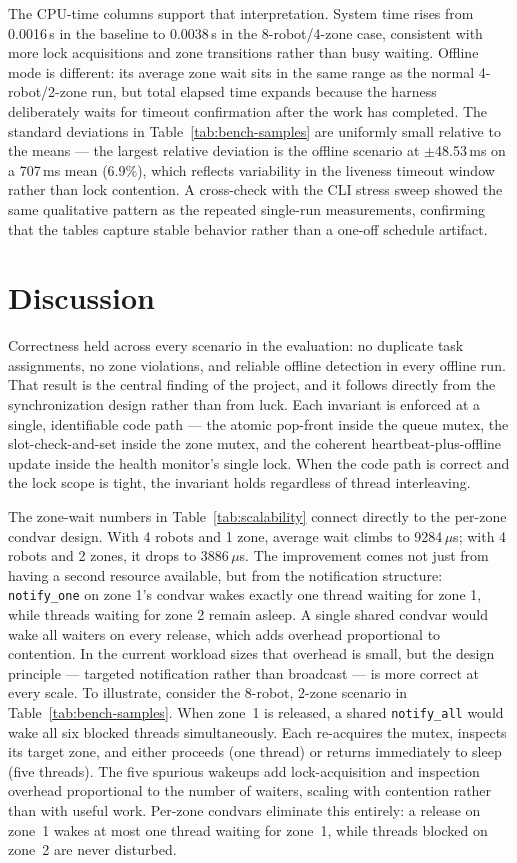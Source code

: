 \documentclass[11pt]{article}
\begin{document}
The CPU-time columns support that interpretation. System time rises from 0.0016\,s in the baseline to 0.0038\,s in the 8-robot/4-zone case, consistent with more lock acquisitions and zone transitions rather than busy waiting. Offline mode is different: its average zone wait sits in the same range as the normal 4-robot/2-zone run, but total elapsed time expands because the harness deliberately waits for timeout confirmation after the work has completed. The standard deviations in Table~\ref{tab:bench-samples} are uniformly small relative to the means --- the largest relative deviation is the offline scenario at \(\pm\)48.53\,ms on a 707\,ms mean (6.9\%), which reflects variability in the liveness timeout window rather than lock contention. A cross-check with the CLI stress sweep showed the same qualitative pattern as the repeated single-run measurements, confirming that the tables capture stable behavior rather than a one-off schedule artifact.

\section{Discussion}
Correctness held across every scenario in the evaluation: no duplicate task assignments, no zone violations, and reliable offline detection in every offline run. That result is the central finding of the project, and it follows directly from the synchronization design rather than from luck. Each invariant is enforced at a single, identifiable code path --- the atomic pop-front inside the queue mutex, the slot-check-and-set inside the zone mutex, and the coherent heartbeat-plus-offline update inside the health monitor's single lock. When the code path is correct and the lock scope is tight, the invariant holds regardless of thread interleaving.

The zone-wait numbers in Table~\ref{tab:scalability} connect directly to the per-zone condvar design. With 4 robots and 1 zone, average wait climbs to 9284\,$\mu$s; with 4 robots and 2 zones, it drops to 3886\,$\mu$s. The improvement comes not just from having a second resource available, but from the notification structure: \texttt{notify\_one} on zone 1's condvar wakes exactly one thread waiting for zone 1, while threads waiting for zone 2 remain asleep. A single shared condvar would wake all waiters on every release, which adds overhead proportional to contention. In the current workload sizes that overhead is small, but the design principle --- targeted notification rather than broadcast --- is more correct at every scale. To illustrate, consider the 8-robot, 2-zone scenario in Table~\ref{tab:bench-samples}. When zone~1 is released, a shared \texttt{notify\_all} would wake all six blocked threads simultaneously. Each re-acquires the mutex, inspects its target zone, and either proceeds (one thread) or returns immediately to sleep (five threads). The five spurious wakeups add lock-acquisition and inspection overhead proportional to the number of waiters, scaling with contention rather than with useful work. Per-zone condvars eliminate this entirely: a release on zone~1 wakes at most one thread waiting for zone~1, while threads blocked on zone~2 are never disturbed.
\end{document}
